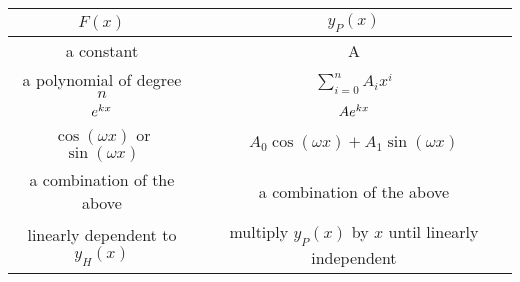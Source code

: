 \documentclass{article}
\begin{document}
\begin{table}[H]
    \centering
    \begin{tabular}{c c}
        \toprule
        \(F(x)\)                                                               & \(y_P(x)\)                                                                \\
        \midrule
        a constant                                                             & A                                                                         \\
        a polynomial of degree \(n\)                                           & \(\displaystyle \sum_{i = 0}^n A_i x^i\)                                  \\
        \(e^{kx}\)                                                            & \(A e^{kx}\)                                                             \\
        \(\cos{\left( \omega x \right)}\) or \(\sin{\left( \omega x \right)}\) & \(A_0 \cos{\left( \omega x \right)} + A_1 \sin{\left( \omega x \right)}\) \\
        a combination of the above                                             & a combination of the above                                                \\
        linearly dependent to \(y_H(x)\)                                       & multiply \(y_P(x)\) by \(x\) until linearly independent                   \\
        \bottomrule
    \end{tabular}
\end{table}
\end{document}
